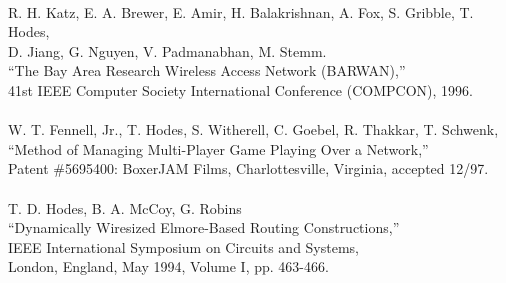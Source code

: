 \begin{tabbing}
\smallskip \\[-3pt]
\>    R. H. Katz, E. A. Brewer, E. Amir, H. Balakrishnan, A. Fox,
       S. Gribble, T. Hodes, \\
\>\>\>   D. Jiang, G. Nguyen, V. Padmanabhan, M. Stemm. \\
\>\> ``The Bay Area Research Wireless Access Network (BARWAN),''  \\
\>\> 41st IEEE Computer Society International Conference (COMPCON), 1996. \\
\smallskip \\
\>	W. T. Fennell, Jr., T. Hodes, S. Witherell, C. Goebel, 
	R. Thakkar, T. Schwenk, \\
\>\>	``Method of Managing Multi-Player Game Playing Over a Network,''  \\
\>\>	Patent \#5695400: BoxerJAM Films, Charlottesville, Virginia, accepted 12/97.  \\
\smallskip \\
\>    T. D. Hodes, B. A. McCoy, G. Robins \\
\>\>  ``Dynamically Wiresized Elmore-Based Routing Constructions,''  \\
\> IEEE International Symposium on Circuits and Systems, \\
\>\>   London, England, May 1994, Volume I, pp. 463-466. \\
\smallskip \\
\end{tabbing}








